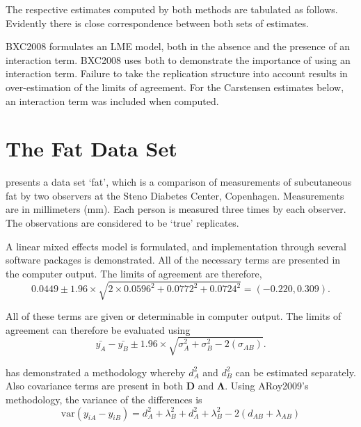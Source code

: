 \documentclass[12pt, a4paper]{report}
\theoremstyle{plain}
\theoremstyle{definition}
\theoremstyle{remark}
\begin{document}
	
	
	The respective estimates computed by both methods are tabulated as follows. Evidently there is close correspondence between both sets of estimates.
	
	BXC2008 formulates an LME model, both in the absence and the presence of an interaction term. BXC2008 uses both to demonstrate the importance of using an interaction term. Failure to take the replication structure into
	account results in over-estimation of the limits of agreement. 
	For the Carstensen estimates below, an interaction term was included when computed.
	
	
	
	
	
	
	\section{The Fat Data Set}
	
	\citet{BXC2008} presents a data set `fat', which is a comparison of measurements of subcutaneous fat
	by two observers at the Steno Diabetes Center, Copenhagen. Measurements are in millimeters
	(mm). Each person is measured three times by each observer. The observations are considered to be `true' replicates.
	
	
	A linear mixed effects model is formulated, and implementation through several software packages is demonstrated.
	All of the necessary terms are presented in the computer output. The limits of agreement are therefore,
	\begin{equation}
	0.0449  \pm 1.96 \times  \sqrt{2 \times 0.0596^2 + 0.0772^2 + 0.0724^2} = (-0.220,  0.309).
	\end{equation}
	
	All of these terms are given or determinable in computer output. The limits of agreement can therefore be evaluated using
	\begin{equation}
	\bar{y_{A}}-\bar{y_{B}} \pm 1.96 \times \sqrt{ \sigma^2_{A} + \sigma^2_{B}  - 2(\sigma_{AB})}.
	\end{equation}
	
	
	
	\citet{ARoy2009} has demonstrated a methodology whereby $d^2_{A}$ and $d^2_{B}$ can be estimated separately. Also covariance terms are present in both $\boldsymbol{D}$ and $\boldsymbol{\Lambda}$. Using ARoy2009's methodology, the variance of the differences is
	\begin{equation}
	\mbox{var} (y_{iA}-y_{iB})= d^2_{A} + \lambda^2_{B} + d^2_{A} + \lambda^2_{B} - 2(d_{AB} + \lambda_{AB})
	\end{equation}
	
\end{document}
